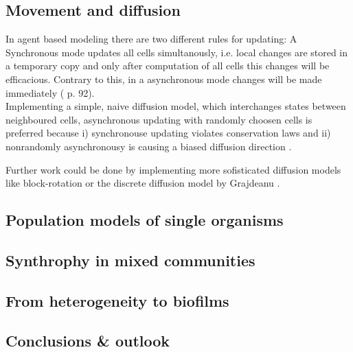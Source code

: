 \subsection{Movement and diffusion}
In agent based modeling there are two different rules for updating:
A Synchronous mode updates all cells simultanously, i.e. local changes are stored in a temporary copy and only after computation of all cells this changes will be efficacious.
Contrary to this, in a asynchronous mode changes will be made immediately (\cite{Matthies2002} p. 92).\\
Implementing a simple, naive diffusion model, which interchanges states between neighboured cells, asynchronous updating with randomly choosen cells is preferred because i) synchronouse updating violates conservation laws and ii) nonrandomly asynchronousy is causing a biased diffusion direction \cite{Bandman1999}.

Further work could be done by implementing more sofisticated diffusion models like block-rotation \cite{Bandman1999} or the discrete diffusion model by Grajdeanu \cite{Grajdeanu2007}.
\subsection{Population models of single organisms}
\subsection{Synthrophy in mixed communities}
\subsection{From heterogeneity to biofilms}
\subsection{Conclusions \& outlook}

